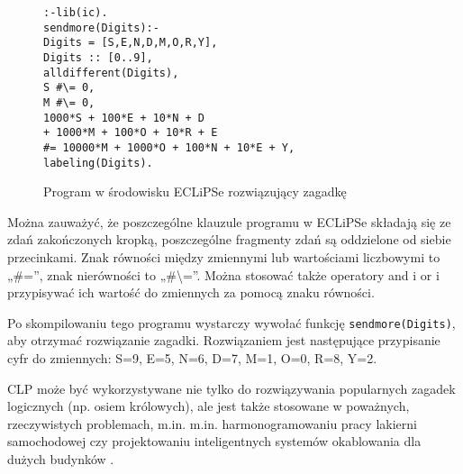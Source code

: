 \begin{figure}
\begin{verbatim}
:-lib(ic).
sendmore(Digits):-
Digits = [S,E,N,D,M,O,R,Y],
Digits :: [0..9],
alldifferent(Digits),
S #\= 0,
M #\= 0,
1000*S + 100*E + 10*N + D
+ 1000*M + 100*O + 10*R + E
#= 10000*M + 1000*O + 100*N + 10*E + Y,
labeling(Digits).
\end{verbatim}
\caption{Program w środowisku ECLiPSe rozwiązujący zagadkę}
\label{fig:eclipse_program}
\end{figure}

Można zauważyć, że poszczególne klauzule programu w ECLiPSe składają się ze zdań zakończonych kropką, poszczególne fragmenty zdań są oddzielone od siebie przecinkami. Znak równości między zmiennymi lub wartościami liczbowymi to „\#=”, znak nierówności to „\#\textbackslash=”. Można stosować także operatory and i or i przypisywać ich wartość do zmiennych za pomocą znaku równości. 

Po skompilowaniu tego programu wystarczy wywołać funkcję \texttt{sendmore(Digits)}, aby otrzymać rozwiązanie zagadki. Rozwiązaniem jest następujące przypisanie cyfr do zmiennych: S=9, E=5, N=6, D=7, M=1, O=0, R=8, Y=2. 

CLP może być wykorzystywane nie tylko do rozwiązywania popularnych zagadek logicznych (np. osiem królowych), ale jest także stosowane w poważnych, rzeczywistych problemach, m.in. m.in. harmonogramowaniu pracy lakierni samochodowej czy projektowaniu inteligentnych systemów okablowania dla dużych budynków \cite{niederlinski}.


